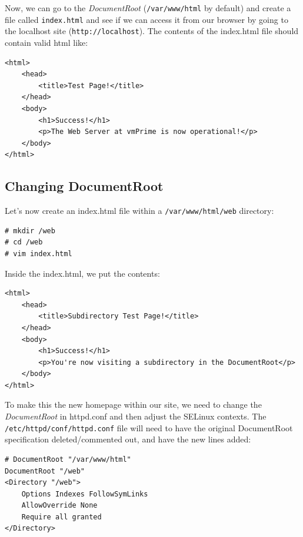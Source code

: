 \noindent
Now, we can go to the \textit{DocumentRoot} (\verb|/var/www/html| by default) and create a file called \verb|index.html| and see if we can access it from our browser by going to the localhost site (\verb|http://localhost|). The contents of the index.html file should contain valid html like:

\vspace{-15pt}
\begin{verbatim}
<html>
	<head>
		<title>Test Page!</title>
	</head>
	<body>
		<h1>Success!</h1>
		<p>The Web Server at vmPrime is now operational!</p>
	</body>
</html>
\end{verbatim}
\vspace{-10pt}	

\subsection{Changing DocumentRoot}
Let's now create an index.html file within a \verb|/var/www/html/web| directory:

\vspace{-15pt}
\begin{verbatim}
# mkdir /web
# cd /web
# vim index.html
\end{verbatim}
\vspace{-10pt}	

\noindent
Inside the index.html, we put the contents:

\vspace{-15pt}
\begin{verbatim}
<html>
	<head>
		<title>Subdirectory Test Page!</title>
	</head>
	<body>
		<h1>Success!</h1>
		<p>You're now visiting a subdirectory in the DocumentRoot</p>
	</body>
</html>
\end{verbatim}
\vspace{-10pt}	

\noindent
To make this the new homepage within our site, we need to change the \textit{DocumentRoot} in httpd.conf and then adjust the SELinux contexts. The \verb|/etc/httpd/conf/httpd.conf| file will need to have the original DocumentRoot specification deleted/commented out, and have the new lines added:

\vspace{-15pt}
\begin{verbatim}
# DocumentRoot "/var/www/html"
DocumentRoot "/web"
<Directory "/web">
	Options Indexes FollowSymLinks
	AllowOverride None
	Require all granted
</Directory>
\end{verbatim}
\vspace{-10pt}	

